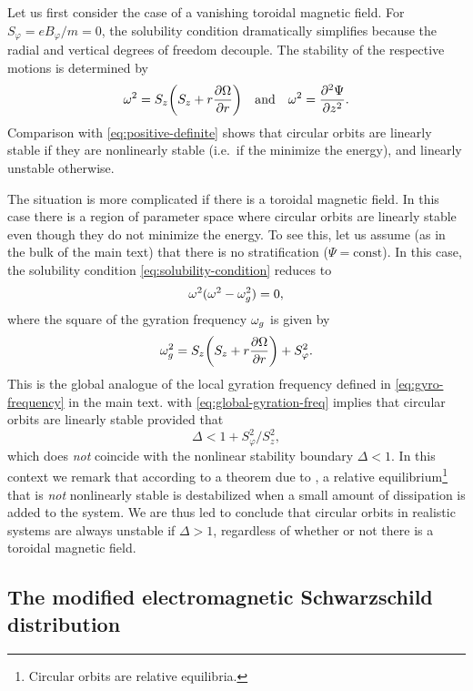 \documentclass[aps,pre,notitlepage,amsmath,amssymb,amsfonts,nobibnotes,nofootinbib]{revtex4-1}
\begin{document}
Let us first consider the case of a vanishing toroidal magnetic field. For
$S_\varphi=eB_\varphi/m=0$, the solubility condition
 dramatically simplifies because the radial
and vertical degrees of freedom decouple. The stability of the respective
motions is determined by
\begin{equation}
  \omega^2 = S_z\left(S_z + r\pder{\Omega}{r}\right)
  \quad\textrm{and}\quad
  \omega^2 = \pdder{\Psi}{z}.
\end{equation}
Comparison with \cref{eq:positive-definite} shows that circular orbits are
linearly stable if they are nonlinearly stable (i.e.\ if the minimize the
energy), and linearly unstable otherwise.

The situation is more complicated if there is a toroidal magnetic field. In
this case there is a region of parameter space where circular orbits are
linearly stable even though they do not minimize the energy. To see this, let
us assume (as in the bulk of the main text) that there is no stratification
($\Psi=\mathrm{const}$). In this case, the solubility condition
\cref{eq:solubility-condition} reduces to
\begin{equation}
  \label{eq:solubility-no-stratification}
  \omega^2(\omega^2 - \omg^2) = 0,
\end{equation}
where the square of the gyration frequency $\omega_g$ is given by
\begin{equation}
  \label{eq:global-gyration-freq}
  \omg^2 = S_z\left(S_z + r\pder{\Omega}{r}\right) + S_\varphi^2.
\end{equation}
This is the global analogue of the local gyration frequency defined in
\cref{eq:gyro-frequency} in the main text.
 with \cref{eq:global-gyration-freq}
implies that circular orbits are linearly stable provided that
\begin{equation}
  \Delta < 1 + S_\varphi^2/S_z^2,
\end{equation}
which does \emph{not} coincide with the nonlinear stability boundary
$\Delta<1$. In this context we remark that according to a theorem due to
\citet{Bloch1994}, a relative equilibrium\footnote{Circular orbits are
  relative equilibria.} that is \emph{not} nonlinearly stable is destabilized
when a small amount of dissipation is added to the system. We are thus led to
conclude that circular orbits in realistic systems are always unstable if
$\Delta>1$, regardless of whether or not there is a toroidal magnetic field.

\subsection{The modified electromagnetic Schwarzschild distribution}
\end{document}
